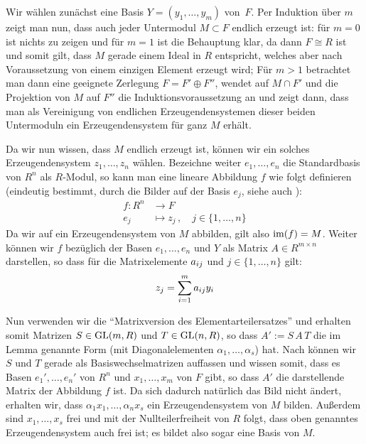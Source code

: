 \begin{proofsketch}
    Wir wählen zunächst eine Basis $Y = (y_1,\ldots,y_m)$ von~$F$. Per Induktion
    über $m$ zeigt man nun, dass auch jeder Untermodul $M\subset F$ endlich
    erzeugt ist: für $m=0$ ist nichts zu zeigen und für $m=1$ ist die Behauptung
    klar, da dann $F\cong R$ ist und somit gilt, dass $M$ gerade einem Ideal in
    $R$ entspricht, welches aber nach Voraussetzung von einem einzigen Element erzeugt
    wird; Für $m>1$ betrachtet man dann eine geeignete Zerlegung $F = F'
    \oplus F''$, wendet auf $M\cap F'$ und die Projektion von $M$ auf $F''$ die
    Induktionsvoraussetzung an und zeigt dann, dass man als Vereinigung von
    endlichen Erzeugendensystemen dieser beiden Untermoduln ein
    Erzeugendensystem für ganz $M$ erhält.
    
    Da wir nun wissen, dass $M$ endlich erzeugt ist, können wir ein solches
    Erzeugendensystem $z_1,\ldots,z_n$ wählen. Bezeichne weiter $e_1,\ldots,e_n$
    die Standardbasis von $R^n$ als $R$-Modul, so kann man eine lineare
    Abbildung $f$ wie folgt definieren (eindeutig bestimmt, durch die Bilder auf
    der Basis $e_j$, siehe auch \cite[1.1\,ff.]{talk:rei}):
    \begin{align*}
        f\colon R^n &\to F  \\
        e_j &\mapsto z_j \,, \quad j\in\{1,\ldots,n\}
    \end{align*}
    Da wir auf ein Erzeugendensystem von $M$ abbilden, gilt also
    $\operatorname{im}(f) = M$. Weiter können wir $f$ bezüglich der Basen $e_1,\ldots,e_n$
    und $Y$ als Matrix $A\in R^{m\times n}$ darstellen, so dass für die
    Matrixelemente $a_{ij}$ und $j\in\{1,\ldots,n\}$ gilt:
    \[ z_j = \sum_{i=1}^m a_{ij} y_i \]
    
    Nun verwenden wir die \enquote{Matrixversion des Elementarteilersatzes}
    und erhalten somit Matrizen $S\in\mathrm{GL}(m,R)$ und $T\in\mathrm{GL}(n,R)$, so
    dass $A' := S\,A\,T$ die im Lemma genannte Form (mit Diagonalelementen
    $\alpha_1,\ldots,\alpha_s$) hat. Nach \cite[1.11]{talk:ruemp}
    können wir $S$ und $T$ gerade als Basiswechselmatrizen auffassen und
    wissen somit, dass es Basen $e_1',\ldots,e_n'$ von $R^n$ und
    $x_1,\ldots,x_m$ von $F$ gibt, so dass $A'$ die darstellende Matrix der
    Abbildung $f$ ist. Da sich dadurch natürlich das Bild nicht ändert, erhalten
    wir, dass $\alpha_1 x_1, \ldots, \alpha_n x_s$ ein Erzeugendensystem von $M$
    bilden. Außerdem sind $x_1,\ldots,x_s$ frei und mit der Nullteilerfreiheit
    von $R$ folgt, dass oben genanntes Erzeugendensystem auch frei ist; es
    bildet also sogar eine Basis von $M$.
    \\
\end{proofsketch}

